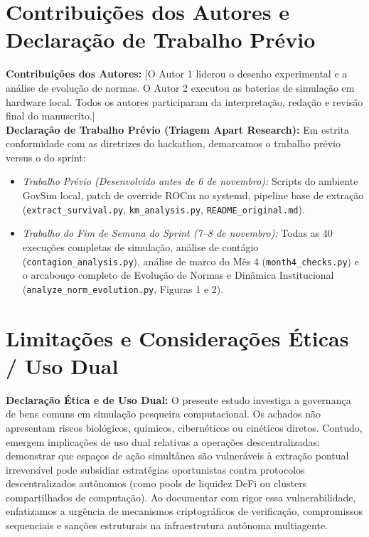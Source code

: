 ﻿\documentclass[11pt,a4paper]{article}
\begin{document}
\section*{Contribuições dos Autores e Declaração de Trabalho Prévio}
\textbf{Contribuições dos Autores:} [O Autor 1 liderou o desenho experimental e a análise de evolução de normas. O Autor 2 executou as baterias de simulação em hardware local. Todos os autores participaram da interpretação, redação e revisão final do manuscrito.] \\
\textbf{Declaração de Trabalho Prévio (Triagem Apart Research):} Em estrita conformidade com as diretrizes do hackathon, demarcamos o trabalho prévio versus o do sprint:
\begin{itemize}[leftmargin=*,itemsep=1pt]
    \item \textit{Trabalho Prévio (Desenvolvido antes de 6 de novembro):} Scripts do ambiente GovSim local, patch de override ROCm no systemd, pipeline base de extração (\texttt{extract\_survival.py}, \texttt{km\_analysis.py}, \texttt{README\_original.md}).
    \item \textit{Trabalho do Fim de Semana do Sprint (7--8 de novembro):} Todas as 40 execuções completas de simulação, análise de contágio (\texttt{contagion\_analysis.py}), análise de marco do Mês 4 (\texttt{month4\_checks.py}) e o arcabouço completo de Evolução de Normas e Dinâmica Institucional (\texttt{analyze\_norm_evolution.py}, Figuras 1 e 2).
\end{itemize}

\section*{Limitações e Considerações Éticas / Uso Dual}
\textbf{Declaração Ética e de Uso Dual:} O presente estudo investiga a governança de bens comuns em simulação pesqueira computacional. Os achados não apresentam riscos biológicos, químicos, cibernéticos ou cinéticos diretos. Contudo, emergem implicações de uso dual relativas a operações descentralizadas: demonstrar que espaços de ação simultânea são vulneráveis à extração pontual irreversível pode subsidiar estratégias oportunistas contra protocolos descentralizados autônomos (como pools de liquidez DeFi ou clusters compartilhados de computação). Ao documentar com rigor essa vulnerabilidade, enfatizamos a urgência de mecanismos criptográficos de verificação, compromissos sequenciais e sanções estruturais na infraestrutura autônoma multiagente.
\end{document}
